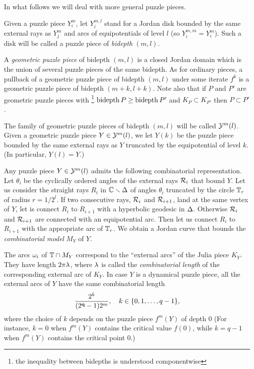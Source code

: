 In what follows  we will deal with more general puzzle pieces.

Given  a puzzle piece $Y^m_i$, let $Y^{m,l}_i$ stand for a Jordan disk bounded by the same external rays
as $Y^m_j$ and arcs of equipotentials of level $l$ (so $Y^{m,m}_i=Y^m_i$).
Such a  disk will be called a puzzle piece of {\it bidepth} $(m,l)$.

A {\it geometric puzzle piece} of bidepth $(m,l)$ is a closed Jordan domain which is
the union of several puzzle pieces of the same bidepth.
As for ordinary pieces, a pullback of a geometric puzzle piece of bidepth $(m,l)$
under some iterate $f^k$ is a geometric puzzle piece of bidepth $(m+k, l+k)$.
Note also that if $P$ and $P'$ are geometric puzzle pieces with%
\footnote{the inequality between bidepths is understood componentwise}
$\operatorname{bidepth} P \geq \operatorname{bidepth} P'$
and $K_P\subset K_{P'}$ then $P\subset P'$.

The family of geometric puzzle pieces of bidepth $(m,l)$ will be called ${\mathcal Y}^m(l)$.
Given a geometric puzzle piece $Y\in {\mathcal Y}^m(l)$, we let $Y(k)$ be the puzzle piece
bounded by the same external rays as $Y$ truncated by the equipotential of level $k$.
(In particular, $Y(l)=Y$.)

\msk

Any puzzle piece $Y\in {\mathcal Y}^m(l)$ admits the following combinatorial representation.
Let $\theta_i$ be the cyclically ordered  angles of the external rays ${\mathcal R}_i$ that bound $Y$.
Let us consider the straight rays $R_i$ in ${\Bbb C}\smallsetminus \Delta$ of angles $\theta_i$
truncated by the circle ${\Bbb T}_r$ of radius $r=1/2^l$.
If two consecutive rays, ${\mathcal R}_i$ and ${\mathcal R}_{i+1}$, land at the same vertex of $Y$,
let is connect $R_i$ to $R_{i+1}$ with a hyperbolic geodesic in $\Delta$.
Otherwise ${\mathcal R}_i$ and ${\mathcal R}_{i+1}$ are connected with an equipotential arc.
Then let us connect $R_i$ to $R_{i+1}$ with the appropriate arc of ${\Bbb T}_r$.
We obtain a Jordan curve that bounds the {\it combinatorial model} $M_Y$ of $Y$.

 The arcs ${\omega}_i$ of  ${\Bbb T}\cap M_Y$ correspond to  the
``external arcs'' of the Julia piece $K_Y$.
 They have length $2\pi {\lambda}$, where ${\lambda}$ is called the {\it combinatorial length}
of the corresponding external arc of $K_Y$.
In case $Y$ is a dynamical puzzle piece,
all the external arcs of $Y$ have  the same combinatorial length
\begin{equation}\label{comb length}
    \frac{2^k}{(2^{\mathbf{q}}-1)2^m}, \quad k\in \{0,1,\dots, q-1\},
\end{equation}
where the choice of $k$ depends on  the puzzle piece $f^m(Y)$ of depth 0
(For instance, $k=0$ when $f^m(Y)$ contains the critical value $f(0)$,
 while $k=q-1$ when $f^m(Y)$ contains the critical point 0.)

